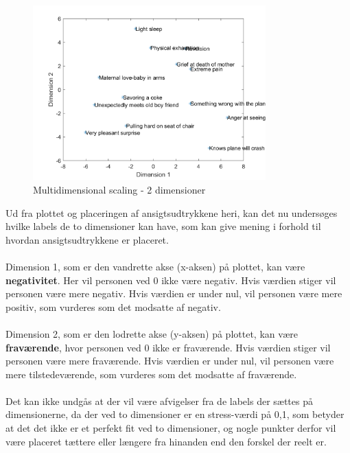 \begin{figure}[H]
\centering
\includegraphics[width = 0.8\textwidth]{Figure/multidimensional.png} 
\caption{Multidimensional scaling - 2 dimensioner}
\label{fig:MDS}
\end{figure}

\noindent Ud fra plottet og placeringen af ansigtsudtrykkene heri, kan det nu undersøges hvilke labels de to dimensioner kan have, som kan give mening i forhold til hvordan ansigtsudtrykkene er placeret. 
\\\\
Dimension 1, som er den vandrette akse (x-aksen) på plottet, kan være \textbf{negativitet}. Her vil personen ved 0 ikke være negativ. Hvis værdien stiger vil personen være mere negativ. Hvis værdien er under nul, vil personen være mere positiv, som vurderes som det modsatte af negativ. 
\\\\
Dimension 2, som er den lodrette akse (y-aksen) på plottet, kan være \textbf{fraværende}, hvor personen ved 0 ikke er fraværende. Hvis værdien stiger vil personen være mere fraværende. Hvis værdien er under nul, vil personen være mere tilstedeværende, som vurderes som det modsatte af fraværende. 
\\\\
Det kan ikke undgås at der vil være afvigelser fra de labels der sættes på dimensionerne, da der ved to dimensioner er en stress-værdi på 0,1, som betyder at det det ikke er et perfekt fit ved to dimensioner, og nogle punkter derfor vil være placeret tættere eller længere fra hinanden end den forskel der reelt er.